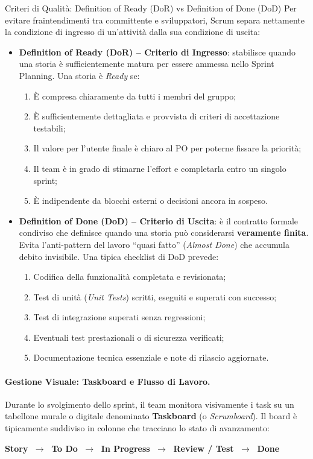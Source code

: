 \documentclass[12pt]{extarticle}
\begin{document}
\begin{cbox}{Criteri di Qualità: Definition of Ready (DoR) vs Definition of Done (DoD)}
\noindent Per evitare fraintendimenti tra committente e sviluppatori, Scrum separa nettamente la condizione di ingresso di un'attività dalla sua condizione di uscita:
\begin{itemize}
    \item \textbf{Definition of Ready (DoR) -- Criterio di Ingresso}: stabilisce quando una storia è sufficientemente matura per essere ammessa nello Sprint Planning. Una storia è \textit{Ready} se:
    \begin{enumerate}
        \item È compresa chiaramente da tutti i membri del gruppo;
        \item È sufficientemente dettagliata e provvista di criteri di accettazione testabili;
        \item Il valore per l'utente finale è chiaro al PO per poterne fissare la priorità;
        \item Il team è in grado di stimarne l'effort e completarla entro un singolo sprint;
        \item È indipendente da blocchi esterni o decisioni ancora in sospeso.
    \end{enumerate}
    \item \textbf{Definition of Done (DoD) -- Criterio di Uscita}: è il contratto formale condiviso che definisce quando una storia può considerarsi \textbf{veramente finita}. Evita l'anti-pattern del lavoro ``quasi fatto'' (\textit{Almost Done}) che accumula debito invisibile. Una tipica checklist di DoD prevede:
    \begin{enumerate}
        \item Codifica della funzionalità completata e revisionata;
        \item Test di unità (\textit{Unit Tests}) scritti, eseguiti e superati con successo;
        \item Test di integrazione superati senza regressioni;
        \item Eventuali test prestazionali o di sicurezza verificati;
        \item Documentazione tecnica essenziale e note di rilascio aggiornate.
    \end{enumerate}
\end{itemize}
\end{cbox}

\paragraph{Gestione Visuale: Taskboard e Flusso di Lavoro.}
Durante lo svolgimento dello sprint, il team monitora visivamente i task su un tabellone murale o digitale denominato \textbf{Taskboard} (o \textit{Scrumboard}). Il board è tipicamente suddiviso in colonne che tracciano lo stato di avanzamento:
\begin{center}
    \textbf{Story} $\;\longrightarrow\;$ \textbf{To Do} $\;\longrightarrow\;$ \textbf{In Progress} $\;\longrightarrow\;$ \textbf{Review / Test} $\;\longrightarrow\;$ \textbf{Done}
\end{center}
\end{document}
